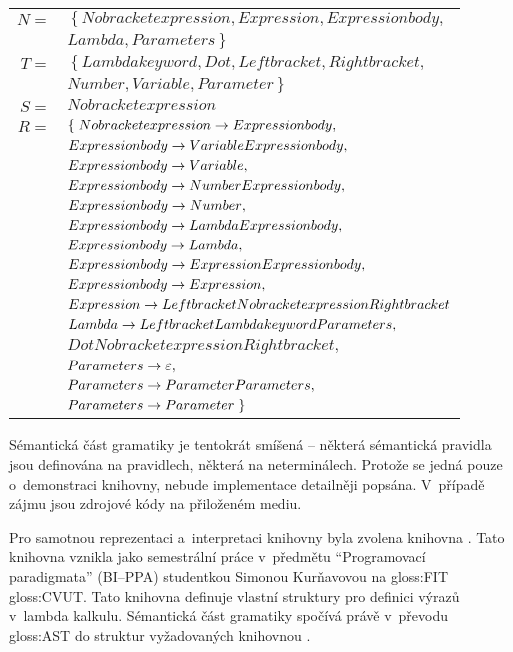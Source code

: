 		\begin{tabular}[ht!]{rl}
			$N=$ & $\left\{\right. Nobracketexpression, Expression, Expressionbody,$ \\
				 & $Lambda, Parameters \left.\right\}$ \\
			$T=$ & $\left\{\right. Lambdakeyword, Dot, Leftbracket, Rightbracket,$ \\
			     & $Number, Variable, Parameter \left.\right\}$ \\	
			$S=$ & $Nobracketexpression$ \\
			$R=$ & $\left\{\right.  {Nobracketexpression} \allowbreak\rightarrow\allowbreak {Expressionbody},$ \\
			& ${Expressionbody} \allowbreak\rightarrow\allowbreak {Variable Expressionbody},$ \\
			& ${Expressionbody} \allowbreak\rightarrow\allowbreak {Variable},$ \\
			& ${Expressionbody} \allowbreak\rightarrow\allowbreak {Number Expressionbody},$ \\
			& ${Expressionbody} \allowbreak\rightarrow\allowbreak {Number},$ \\
			& ${Expressionbody} \allowbreak\rightarrow\allowbreak {Lambda Expressionbody},$ \\
			& ${Expressionbody} \allowbreak\rightarrow\allowbreak {Lambda},$ \\
			& ${Expressionbody} \allowbreak\rightarrow\allowbreak {Expression Expressionbody},$ \\
			& ${Expressionbody} \allowbreak\rightarrow\allowbreak {Expression},$ \\
			& ${Expression} \allowbreak\rightarrow\allowbreak {Leftbracket Nobracketexpression Rightbracket}$\\
			& ${Lambda} \allowbreak\rightarrow\allowbreak {Leftbracket Lambdakeyword Parameters}, $ \\
			& $Dot Nobracketexpression Rightbracket,$ \\
			& ${Parameters} \allowbreak\rightarrow\allowbreak {\varepsilon},$ \\
			& ${Parameters} \allowbreak\rightarrow\allowbreak {Parameter Parameters},$ \\
			& ${Parameters} \allowbreak\rightarrow\allowbreak {Parameter}  \left.\right\}$ \\
		\end{tabular}
	
		Sémantická část gramatiky je tentokrát smíšená -- některá sémantická pravidla jsou definována na pravidlech, některá na neterminálech. Protože se jedná pouze o~demonstraci knihovny, nebude implementace detailněji popsána. V~případě zájmu jsou zdrojové kódy na přiloženém mediu.
		
		Pro samotnou reprezentaci a~interpretaci knihovny byla zvolena knihovna  \cite{lambdaInterpreter}. Tato knihovna vznikla jako semestrální práce v~předmětu \enquote{Programovací paradigmata} (BI--PPA) studentkou Simonou Kurňavovou na \gls{gloss:FIT} \gls{gloss:CVUT}. 
		Tato knihovna definuje vlastní struktury pro definici výrazů v~lambda kalkulu. Sémantická část gramatiky spočívá právě v~převodu \gls{gloss:AST} do struktur vyžadovaných knihovnou .
		
